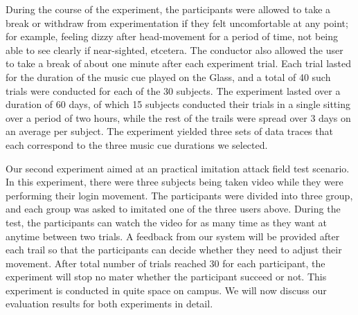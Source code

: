 During the course of the experiment, the participants were allowed to take a 
break or withdraw from experimentation if they felt uncomfortable at any 
point; for example, feeling 
dizzy after head-movement for a period of time, not being able to see clearly 
if near-sighted, etcetera. The conductor also allowed the user to take a break 
of about one minute after each experiment trial.
Each trial lasted for the duration of the music cue played on the Glass, and 
a total of 40 such trials were conducted for each of the 30 subjects. 
The experiment lasted over a duration of 60 days, of which 15 
subjects conducted their trials in a single sitting over a period of two 
hours, while the rest of the trails were spread over 3 days on an average per 
subject.
The experiment yielded three sets of data traces that each correspond to 
the three music cue durations we selected. 

Our second experiment aimed at an practical imitation attack field test scenario. In this experiment, there were three subjects being taken video while they were performing their login movement. The participants were divided into three group, and each group was asked to imitated one of the three users above. During the test, the participants can watch the video for as many time as they want at anytime between two trials. A feedback from our system will be provided after each trail so that the participants can decide whether they need to adjust their movement. After total number of trials reached 30 for each participant, the experiment will stop no mater whether the participant succeed or not. This experiment is conducted in quite space on campus. We will now discuss our evaluation results for both experiments in detail.

